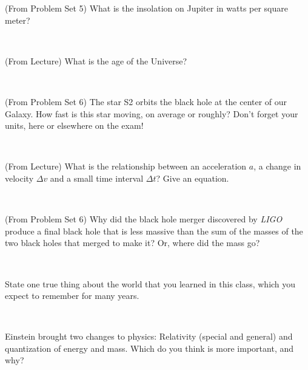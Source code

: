\documentclass[12pt, letterpaper]{article}
\begin{document}
\begin{problem}
(From Problem Set 5)
What is the insolation on Jupiter in watts per square meter?
\end{problem}

\vfill ~

\clearpage

\begin{problem}
(From Lecture)
What is the age of the Universe?
\end{problem}

\vfill ~

\begin{problem}
(From Problem Set 6)
The star S2 orbits the black hole at the center of our Galaxy.
How fast is this star moving, on average or roughly?
Don't forget your units, here or elsewhere on the exam!
\end{problem}

\vfill ~

\begin{problem}
(From Lecture)
What is the relationship between an acceleration $a$, a change in velocity $\Delta v$ and a small time interval $\Delta t$? Give an equation.
\end{problem}

\vfill ~

\begin{problem}
(From Problem Set 6)
Why did the black hole merger discovered by \textsl{LIGO} produce a final black hole that is less massive than the sum of the masses of the two black holes that merged to make it? Or, where did the mass go?
\end{problem}

\vfill ~

\clearpage

\begin{problem}
State one true thing about the world that you learned in this class,
which you expect to remember for many years.
\end{problem}

\vfill ~

\begin{problem}
Einstein brought two changes to physics: Relativity (special and general) and
quantization of energy and mass. Which do you think is more important, and why?
\end{problem}

\vfill ~

~

\vfill ~

~

\vfill ~
\end{document}
